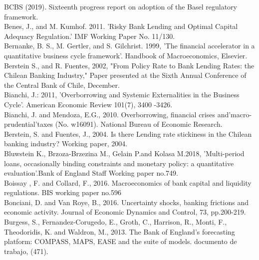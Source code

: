 \documentclass[12pt]{article}
\numberwithin{equation}{section}
\begin{document}
BCBS (2019). Sixteenth progress report on adoption of the Basel regulatory framework. \\

Benes, J., and M. Kumhof. 2011. 'Risky Bank Lending and Optimal
Capital Adequacy Regulation.' IMF Working Paper No. 11/130.\\


Bernanke, B. S., M. Gertler, and S. Gilchrist. 1999, 'The financial accelerator in a quantitative business cycle framework'. Handbook of Macroeconomics, Elsevier.\\

Berstein S., and R. Fuentes, 2002, "From Policy Rate to Bank Lending Rates: the Chilean Banking Industry," Paper presented at the Sixth Annual Conference of the Central Bank of Chile, December.\\

Bianchi, J.: 2011, 'Overborrowing and Systemic Externalities in the Business Cycle'.
American Economic Review 101(7), 3400 -3426.\\

Bianchi, J. and Mendoza, E.G., 2010. Overborrowing, financial crises and'macro-prudential'taxes (No. w16091). National Bureau of Economic Research. \\

Berstein, S. and Fuentes, J., 2004. Is there Lending rate stickiness
in the Chilean banking industry? Working paper, 2004. \\

Bluwstein K., Brzoza-Brzezina M., Gelain P.and Kolasa M.2018, 'Multi-period loans, occasionally binding constraints and monetary policy:
a quantitative evaluation'.Bank of England Staff Working paper no.749.\\

Boissay , F. and Collard, F., 2016. Macroeconomics of
bank capital and
liquidity regulations. BIS working paper no.596 \\


Bonciani, D. and Van Roye, B., 2016. Uncertainty shocks, banking frictions and economic activity. Journal of Economic Dynamics and Control, 73, pp.200-219. \\

Burgess, S., Fernandez-Corugedo, E., Groth, C., Harrison, R., Monti, F., Theodoridis, K. and Waldron, M., 2013. The Bank of England’s forecasting platform: COMPASS, MAPS, EASE and the suite of models. documento de trabajo, (471). \\
\end{document}
